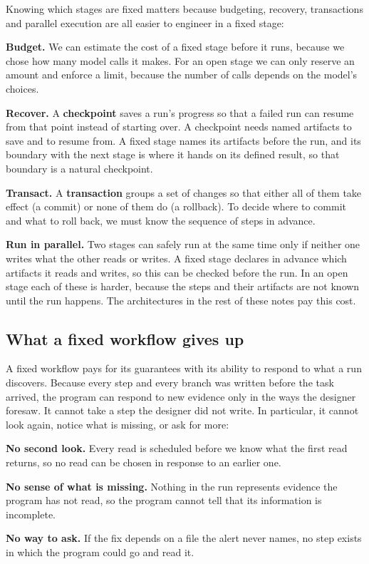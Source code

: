 Knowing which stages are fixed matters because budgeting, recovery, transactions and parallel
execution are all easier to engineer in a fixed stage:
\bi
\item \textbf{Budget.} We can estimate the cost of a fixed stage before it runs, because we chose
how many model calls it makes. For an open stage we can only reserve an amount and enforce a limit,
because the number of calls depends on the model's choices.
\item \textbf{Recover.} A \textbf{checkpoint} saves a run's progress so that a failed run can resume
from that point instead of starting over. A checkpoint needs named artifacts to save and to resume
from. A fixed stage names its artifacts before the run, and its boundary with the next stage is
where it hands on its defined result, so that boundary is a natural checkpoint.
\item \textbf{Transact.} A \textbf{transaction} groups a set of changes so that either all of them
take effect (a commit) or none of them do (a rollback). To decide where to commit and what to roll
back, we must know the sequence of steps in advance.
\item \textbf{Run in parallel.} Two stages can safely run at the same time only if neither one
writes what the other reads or writes. A fixed stage declares in advance which artifacts it reads
and writes, so this can be checked before the run.
\ei
In an open stage each of these is harder, because the steps and their artifacts are not known until
the run happens. The architectures in the rest of these notes pay this cost.

\subsection{What a fixed workflow gives up}
\label{sec:fixed-costs}

A fixed workflow pays for its guarantees with its ability to respond to what a run discovers.
Because every step and every branch was written before the task arrived, the program can respond to
new evidence only in the ways the designer foresaw. It cannot take a step the designer did not
write. In particular, it cannot look again, notice what is missing, or ask for more:
\bi
\item \textbf{No second look.} Every read is scheduled before we know what the first read returns,
so no read can be chosen in response to an earlier one.
\item \textbf{No sense of what is missing.} Nothing in the run represents evidence the program has
not read, so the program cannot tell that its information is incomplete.
\item \textbf{No way to ask.} If the fix depends on a file the alert never names, no step exists in
which the program could go and read it.
\ei


